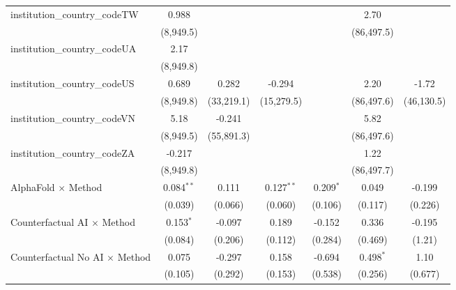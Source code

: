 \begin{tabular}{lcccccc}
   institution\_country\_codeTW          & 0.988         &               &               &               & 2.70         &   \\   
                                         & (8,949.5)     &               &               &               & (86,497.5)   &   \\   
   institution\_country\_codeUA          & 2.17          &               &               &               &              &   \\   
                                         & (8,949.8)     &               &               &               &              &   \\   
   institution\_country\_codeUS          & 0.689         & 0.282         & -0.294        &               & 2.20         & -1.72\\   
                                         & (8,949.8)     & (33,219.1)    & (15,279.5)    &               & (86,497.6)   & (46,130.5)\\   
   institution\_country\_codeVN          & 5.18          & -0.241        &               &               & 5.82         &   \\   
                                         & (8,949.5)     & (55,891.3)    &               &               & (86,497.6)   &   \\   
   institution\_country\_codeZA          & -0.217        &               &               &               & 1.22         &   \\   
                                         & (8,949.8)     &               &               &               & (86,497.7)   &   \\   
   AlphaFold $\times$ Method             & 0.084$^{**}$  & 0.111         & 0.127$^{**}$  & 0.209$^{*}$   & 0.049        & -0.199\\   
                                         & (0.039)       & (0.066)       & (0.060)       & (0.106)       & (0.117)      & (0.226)\\   
   Counterfactual AI $\times$ Method     & 0.153$^{*}$   & -0.097        & 0.189         & -0.152        & 0.336        & -0.195\\   
                                         & (0.084)       & (0.206)       & (0.112)       & (0.284)       & (0.469)      & (1.21)\\   
   Counterfactual No AI $\times$ Method  & 0.075         & -0.297        & 0.158         & -0.694        & 0.498$^{*}$  & 1.10\\   
                                         & (0.105)       & (0.292)       & (0.153)       & (0.538)       & (0.256)      & (0.677)\\   

\end{tabular}
